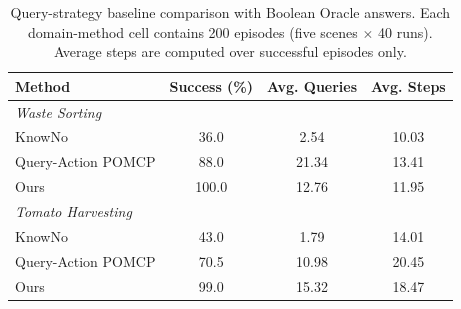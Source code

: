 \begin{table}[t]
\centering
\caption{Query-strategy baseline comparison with Boolean Oracle answers. Each domain-method cell contains 200 episodes (five scenes $\times$ 40 runs). Average steps are computed over successful episodes only.}
\label{tab:query_baselines}
\footnotesize
\begin{tabular}{lccc}
\toprule
\textbf{Method} & \textbf{Success (\%)} & \textbf{Avg. Queries} & \textbf{Avg. Steps} \\
\midrule
\multicolumn{4}{l}{\textit{Waste Sorting}} \\
KnowNo & 36.0 & 2.54 & 10.03 \\
Query-Action POMCP & 88.0 & 21.34 & 13.41 \\
Ours & 100.0 & 12.76 & 11.95 \\
\midrule
\multicolumn{4}{l}{\textit{Tomato Harvesting}} \\
KnowNo & 43.0 & 1.79 & 14.01 \\
Query-Action POMCP & 70.5 & 10.98 & 20.45 \\
Ours & 99.0 & 15.32 & 18.47 \\
\bottomrule
\end{tabular}
\end{table}
